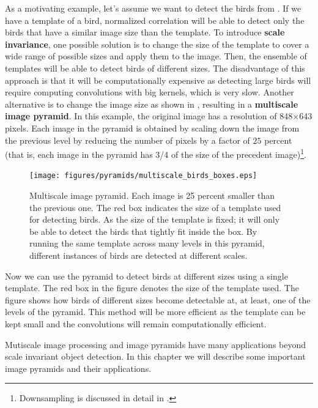 As a motivating example, let's assume we want to detect the birds from \fig{\ref{fig:birds_multiscale}}. 
If we have a template of a bird, normalized correlation will be able to detect only the birds that have a similar image size than the template. To introduce {\bf scale invariance},
one possible solution is to change the size of the template to cover a wide range of possible sizes and apply them to the image. Then, the ensemble of templates will be able to detect birds of different sizes. The disadvantage of this approach is that it will be computationally expensive as detecting large birds will require computing convolutions with big kernels, which is very slow. Another alternative is to change the image size as shown in \fig{\ref{fig:birds_multiscale_processing}}, resulting in a {\bf multiscale image pyramid}.
In this example, the original image has a resolution of 848$\times$643 pixels. Each image in the pyramid is obtained by scaling down the image from the previous level by reducing the number of pixels by a factor of $25$ percent (that is, each image in the pyramid has 3/4 of the size of the precedent image)\footnote{Downsampling is discussed in detail in \chap{\ref{chap:downsampling_and_upsampling}}.}. 


\begin{figure}[t]
\centerline{
\texttt{[image: figures/pyramids/multiscale\_birds\_boxes.eps]}
}
\caption{Multiscale image pyramid. Each image is 25 percent smaller than the previous one. The red box indicates the size of a template used for detecting birds. As the size of the template is fixed; it will only be able to detect the birds that tightly fit inside the box. %
By running the same template across many levels in this pyramid, different instances of birds are detected at different scales.}
\label{fig:birds_multiscale_processing}
\end{figure}


Now we can use the pyramid to detect birds at different sizes using a single template. The red box in the figure denotes the size of the template used. The figure shows how birds of different sizes become detectable at, at least, one of the levels of the pyramid. This method will be more efficient as the template can be kept small and the convolutions will remain computationally efficient. 

Mutiscale image processing and image pyramids have many applications beyond scale invariant object detection. In this chapter we will describe some important image pyramids and their applications. 


